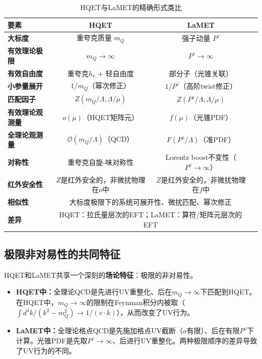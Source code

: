 \documentclass[12pt,a4paper]{ctexart}
\theoremstyle{definition}
\begin{document}
\begin{table}[H]
\centering
\caption{HQET与LaMET的精确形式类比\cite{Ji2014LaMET}}
\label{tab:HQET_LaMET_analogy}
\begin{tabular}{lccc}
\toprule
要素 & HQET & LaMET \\
\midrule
\textbf{大标度}          & 重夸克质量 $m_Q$                    & 强子动量 $P^z$ \\
\textbf{有效理论极限}    & $m_Q \to \infty$                     & $P^z \to \infty$ \\
\textbf{有效自由度}      & 重夸克$h_v$ + 轻自由度              & 部分子（光锥关联） \\
\textbf{小参量展开}      & $1/m_Q$（幂次修正）                 & $1/P^z$（高阶twist修正） \\
\textbf{匹配因子}        & $Z(m_Q/\Lambda, \Lambda/\mu)$        & $Z(P^z/\Lambda, \Lambda/\mu)$ \\
\textbf{有效理论观测量}  & $o(\mu)$（HQET矩阵元）              & $f(\mu)$（光锥PDF） \\
\textbf{全理论观测量}    & $\mathcal{O}(m_Q/\Lambda)$（QCD）    & $F(P^z/\Lambda)$（准PDF） \\
\textbf{对称性}          & 重夸克自旋-味对称性                & Lorentz boost不变性（$P^z \to \infty$） \\
\textbf{红外安全性}      & $Z$是红外安全的，非微扰物理在$o$中 & $Z$是红外安全的，非微扰物理在$f$中 \\
\midrule
\textbf{相似性} & \multicolumn{2}{c}{大标度极限下的系统可展开性、微扰匹配、幂次修正} \\
\textbf{差异}   & \multicolumn{2}{c}{HQET：拉氏量层次的EFT；LaMET：算符/矩阵元层次的EFT} \\
\bottomrule
\end{tabular}
\end{table}

\subsection{极限非对易性的共同特征}

HQET和LaMET共享一个深刻的\textbf{场论特征}：极限的非对易性\cite{Ji2014LaMET,Ji2017More}。

\begin{itemize}
    \item \textbf{HQET中：}全理论QCD是先进行UV重整化、后在$m_Q \to \infty$下匹配到HQET。在HQET中，$m_Q \to \infty$的限制在Feynman积分内被取（$\int d^4k / (k^2 - m^2_Q) \to 1/(v\cdot k)$），从而改变了UV行为。
    \item \textbf{LaMET中：}全理论格点QCD是先施加格点UV截断（$a$有限）、后在有限$P^z$下计算。光锥PDF是先取$P^z \to \infty$、后进行UV重整化。两种极限顺序的差异导致了UV行为的不同。
\end{itemize}
\end{document}

